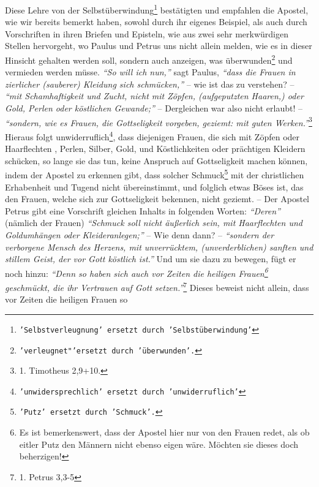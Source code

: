 Diese Lehre von der Selbstüberwindung\footnote{\texttt{'Selbstverleugnung'
ersetzt
durch 'Selbstüberwindung'}} bestätigten und empfahlen die Apostel, wie
wir bereits bemerkt haben, sowohl durch ihr eigenes Beispiel, als auch durch
Vorschriften in ihren Briefen und Episteln, wie aus zwei sehr merkwürdigen
Stellen hervorgeht, wo Paulus und Petrus uns nicht allein melden, wie es in
dieser Hinsicht gehalten werden soll, sondern auch anzeigen, was
überwunden\footnote{\texttt{'verleugnet"'ersetzt durch 'überwunden'.}} und
vermieden werden müsse. \textit{"`So will ich nun,"'} sagt
Paulus,
\textit{"`dass die Frauen in
zierlicher (sauberer) Kleidung sich schmücken,"'} -- wie ist das zu verstehen?
--
\textit{"`mit Schamhaftigkeit und Zucht, nicht mit Zöpfen, (aufgeputzten
Haaren,) oder
Gold, Perlen oder köstlichen Gewande;"'} -- Dergleichen war also nicht
erlaubt! -- \textit{"`sondern, wie es Frauen, die Gottseligkeit vorgeben,
geziemt: mit
guten Werken."'}\footnote{1. Timotheus 2,9+10.}
Hieraus folgt unwiderruflich\footnote{\texttt{'unwidersprechlich' ersetzt durch
'unwiderruflich'}}, dass
diejenigen Frauen, die sich mit Zöpfen oder
Haarflechten \label{ref:haarflechten}, Perlen, Silber, Gold,
und Köstlichkeiten oder prächtigen Kleidern schücken, so lange sie das tun,
keine Anspruch auf Gottseligkeit machen können, indem der
Apostel zu erkennen
gibt, dass solcher Schmuck\footnote{\texttt{'Putz' ersetzt durch 'Schmuck'.}}
mit
der christlichen Erhabenheit und Tugend nicht
übereinstimmt, und folglich etwas Böses ist, das den Frauen, welche sich zur
Gottseligkeit bekennen, nicht geziemt. -- Der Apostel Petrus gibt eine
Vorschrift gleichen Inhalts in folgenden Worten: \textit{"`Deren"'} (nämlich der
Frauen)
\textit{"`Schmuck soll nicht äußerlich sein, mit Haarflechten und Goldumhängen
oder
Kleideranlegen;"'} -- Wie denn dann? --
\textit{"`sondern der verborgene Mensch des Herzens,
mit unverrücktem, (unverderblichen) sanften und stillem Geist, der vor Gott
köstlich ist."'} Und um sie dazu zu bewegen, fügt er noch hinzu:
\textit{"`Denn so haben
sich auch vor Zeiten die heiligen Frauen\footnote{Es ist bemerkenswert, dass der
Apostel hier nur von den Frauen redet, als ob eitler Putz den
Männern nicht ebenso eigen wäre. Möchten sie dieses doch beherzigen!}
geschmückt,
die ihr Vertrauen auf Gott setzen."'}\footnote{1. Petrus 3,3-5}
Dieses beweist nicht allein, dass vor Zeiten die heiligen
Frauen so
